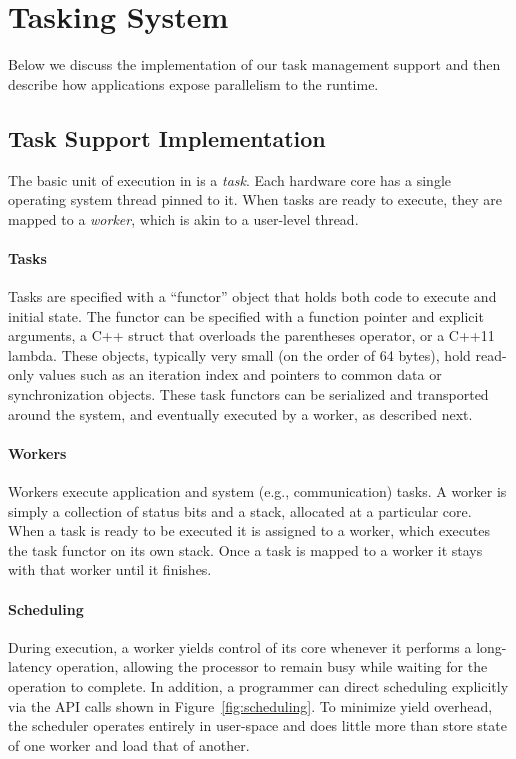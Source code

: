 \section{Tasking System}

Below we discuss the implementation of our task management support and then
describe how applications expose parallelism to the \Grappa runtime.

\subsection{Task Support Implementation}

The basic unit of execution in \Grappa is a {\em task}. Each hardware core has
a single operating system thread pinned to it. When tasks are ready to
execute, they are mapped to a {\em worker}, which is akin to a user-level
thread. %

\paragraph{Tasks} 
Tasks are specified with a ``functor'' object that holds both code to execute and initial state. The functor can be specified with a function pointer and explicit arguments, a C++ struct that overloads the parentheses operator, or a C++11 lambda. These objects, typically very small (on the order of 64 bytes), hold read-only values such as an iteration index and pointers to common data or synchronization objects. These task functors can be serialized and transported around the system, and eventually executed by a worker, as described next.

\paragraph{Workers} Workers execute application and system (e.g.,
communication) tasks. A worker is simply a collection of status bits and a
stack, allocated at a particular core. When a task is ready to be executed it
is assigned to a worker, which executes the task functor on its own stack. 
Once a task is mapped to a worker it stays with that worker until it finishes.

\paragraph{Scheduling} During execution, a worker yields control of its core
whenever it performs a long-latency operation, allowing the processor to
remain busy while waiting for the operation to complete. In addition, a
programmer can direct scheduling explicitly via the \Grappa API calls shown in
Figure~\ref{fig:scheduling}. To minimize yield overhead, the \Grappa scheduler
operates entirely in user-space and does little more than store state of one
worker and load that of another.

